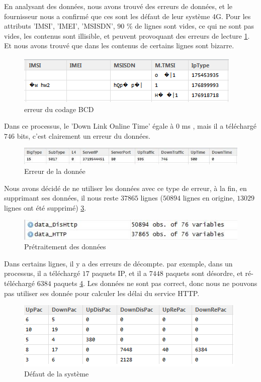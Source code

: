 En analysant des données, nous avons trouvé des erreurs de données, et le fournisseur nous a confirmé que ces sont les défaut de leur système 4G. Pour les attributs 'IMSI', 'IMEI', 'MSISDN', $90$ \% de lignes sont vides, ce qui ne sont pas vides, les contenus sont illisible, et peuvent provoquant des erreurs de lecture \ref{fig:errorData}. Et nous avons trouvé que dans les contenus de certains lignes sont bizarre. 
\begin{figure}[H]
	\centering
	\includegraphics[width=0.7\linewidth]{images/errorData}
	\caption{erreur du codage BCD}
	\label{fig:errorData}
\end{figure}
Dans ce processus, le 'Down Link Online Time' égale à  $0$ ms , mais il a téléchargé $746$ bits, c'est clairement un erreur du données.
\begin{figure}[H]
	\centering
	\includegraphics[width=0.9\linewidth]{images/bizarre}
	\caption{Erreur de la donnée}
	\label{fig:bizarre}
\end{figure}

 Nous avons décidé de ne utiliser les données avec ce type de erreur, à la fin, en supprimant ses données, il nous reste $37865$ lignes ($50894$ lignes en origine, $13029$ lignes ont été supprimé)  \ref{fig:newdata}.
 
\begin{figure}[H]
	\centering
	\includegraphics[width=0.8\linewidth]{images/newdata}
	\caption{Prétraitement des données}
	\label{fig:newdata}
\end{figure}

Dans certains lignes, il y a des erreurs de décompte. par exemple, dans un processus, il a téléchargé  $17$ paquets IP, et il a  $7448$  paquets sont désordre, et  ré-téléchargé  $6384$ paquets  \ref{fig:défaut}. Les données ne sont pas correct, donc nous ne pouvons pas utiliser ses donnée pour calculer les délai du service HTTP.  
\begin{figure}[H]
	\centering
	\includegraphics[width=0.7\linewidth]{images/11}
	\caption{Défaut de la système}
	\label{fig:défaut}
\end{figure}

